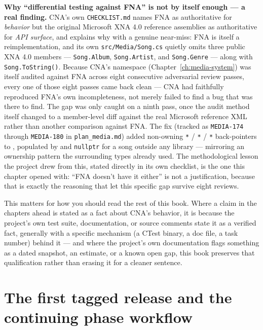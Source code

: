\begin{sourcenote}
\textbf{Why ``differential testing against FNA'' is not by itself enough --- a real finding.}
CNA's own \texttt{CHECKLIST.md} names FNA as authoritative for \emph{behavior} but the original
Microsoft XNA 4.0 reference assemblies as authoritative for \emph{API surface}, and explains why
with a genuine near-miss: FNA is itself a reimplementation, and its own \texttt{src/Media/Song.cs}
quietly omits three public XNA 4.0 members --- \texttt{Song.Album}, \texttt{Song.Artist}, and
\texttt{Song.Genre} --- along with \texttt{Song.ToString()}. Because CNA's  namespace
(Chapter~\ref{ch:media-system}) was itself audited against FNA across eight consecutive
adversarial review passes, every one of those eight passes came back clean --- CNA had faithfully
reproduced FNA's own incompleteness, not merely failed to find a bug that was there to find. The
gap was only caught on a ninth pass, once the audit method itself changed to a member-level diff
against the real Microsoft reference XML rather than another comparison against FNA. The fix
(tracked as \texttt{MEDIA-174} through \texttt{MEDIA-180} in \texttt{plan\_media.md}) added
non-owning \texttt{*} / \texttt{*} / \texttt{*}
back-pointers to ,
populated by  and \texttt{nullptr} for a song outside any library ---
mirroring an ownership pattern the surrounding  types already used. The methodological
lesson the project drew from this, stated directly in its own checklist, is the one this chapter
opened with: ``FNA doesn't have it either'' is not a justification, because that is exactly the
reasoning that let this specific gap survive eight reviews.
\end{sourcenote}

This matters for how you should read the rest of this book. Where a claim in the chapters
ahead is stated as a fact about CNA's behavior, it is because the project's own test suite,
documentation, or source comments state it as a verified fact, generally with a specific
mechanism (a CTest binary, a doc file, a task number) behind it --- and where the project's
own documentation flags something as a dated snapshot, an estimate, or a known open gap, this
book preserves that qualification rather than erasing it for a cleaner sentence.

\section{The first tagged release and the continuing phase workflow}

